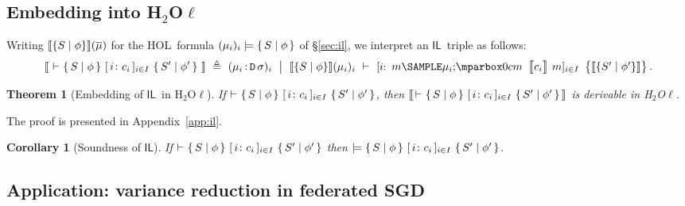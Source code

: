 \documentclass[11pt]{article}
\providecommand{\hoellora}{\textsf{H$\mbox{}_2$O$\ell$}\xspace}
\providecommand{\HOL}{\textsf{HOL}\xspace}
\newcommand{\iHL}{\ensuremath{\mathsf{IL}}\xspace}   %
\providecommand{\dsg}[1]{\llbracket #1 \rrbracket}
\theoremstyle{plain}\newtheorem{lemma}{Lemma}\newtheorem{theorem}{Theorem}\newtheorem{corollary}{Corollary}
\theoremstyle{definition}\newtheorem{definition}{Definition}
\begin{document}
\subsection{Embedding into \hoellora}

\label{sec:il-embed}

Writing $\dsg{\{S\mid\form\}}(\hvec\dist)$ for the \HOL\ formula
$(\mu_i)_i\models\{\,S\mid\phi\,\}$ of \S\ref{sec:il}, we interpret an \iHL\
triple as follows:
\[
  \dsg{\ \judge \{\,S\mid\form\,\}\ [\,i\colon c_i\,]_{i\in I}\ \{\,S'\mid\form'\,\}\ }
  \ \defsym\
  (\dist_i\ofty\tydist\,\sigma)_{i}\ \bigm|\ \dsg{\{S\mid\form\}}(\dist_i)_i
  \ \judge\ \HMAP{\Ix{i}\, \mletin{m}{\dist_i}{\Sem{c_i}\,m}}_{i\in I}
  \ \ASRT{\dsg{\{S'\mid\form'\}}}.
\]

\begin{theorem}[Embedding of \iHL\ in \hoellora]\label{thm:il-emb}
If $\vdash_{}\{\,S\mid\phi\,\}\ [\,i\colon c_i\,]_{i\in I}\ \{\,S'\mid\phi'\,\}$,
then $\dsg{\,\judge\{\,S\mid\form\,\}\ [\,i\colon c_i\,]_{i\in I}\ \{\,S'\mid\form'\,\}\,}$
is derivable in \hoellora.
\end{theorem}

The proof is presented in Appendix~\ref{app:il}.

\begin{corollary}[Soundness of \iHL]\label{cor:il-sound}
If $\vdash_{}\{\,S\mid\phi\,\}\ [\,i\colon c_i\,]_{i\in I}\ \{\,S'\mid\phi'\,\}$
then $\models\{\,S\mid\phi\,\}\ [\,i\colon c_i\,]_{i\in I}\ \{\,S'\mid\phi'\,\}$.
\end{corollary}


\subsection{Application: variance reduction in federated SGD}

\label{sec:il-fedsgd}
\end{document}
